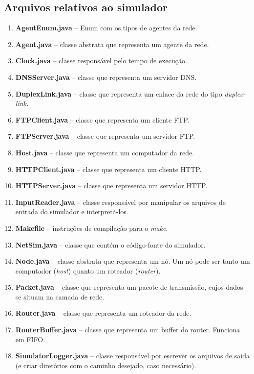 \documentclass[11pt]{article}
\begin{document}
\subsection{Arquivos relativos ao simulador}
\begin{enumerate}

\item \textbf{AgentEnum.java} -- Enum com os tipos de agentes da rede.
\item \textbf{Agent.java} -- classe abstrata que representa um agente da rede.
\item \textbf{Clock.java} -- classe responsável pelo tempo de execução. 
\item \textbf{DNSServer.java} -- classe que representa um servidor DNS.
\item \textbf{DuplexLink.java} -- classe que representa um enlace da rede do tipo \textit{duplex-link.}
\item \textbf{FTPClient.java} -- classe que representa um cliente FTP.
\item \textbf{FTPServer.java} -- classe que representa um servidor FTP.
\item \textbf{Host.java} -- classe que representa um computador da rede.
\item \textbf{HTTPClient.java} -- classe que representa um cliente HTTP.
\item \textbf{HTTPServer.java} -- classe que representa um servidor HTTP.
\item \textbf{InputReader.java} -- classe responsável por manipular os arquivos de
entrada do simulador e interpretá-los.
\item \textbf{Makefile} -- instruções de compilação para o \textit{make}.
\item \textbf{NetSim.java} -- classe que contém o código-fonte do simulador.
\item \textbf{Node.java} -- classe abstrata que representa um nó. Um nó pode ser tanto um computador (\textit{host}) quanto um roteador (\textit{router}).
\item \textbf{Packet.java} -- classe que representa um pacote de transmissão, cujos dados se situam na camada de rede.
\item \textbf{Router.java} -- classe que representa um roteador da rede.
\item \textbf{RouterBuffer.java} -- classe que representa um buffer do router. Funciona em FIFO.
\item \textbf{SimulatorLogger.java} -- classe responsável por escrever os arquivos de saída (e criar diretórios com o caminho desejado, caso necessário).

\end{enumerate}
\end{document}
